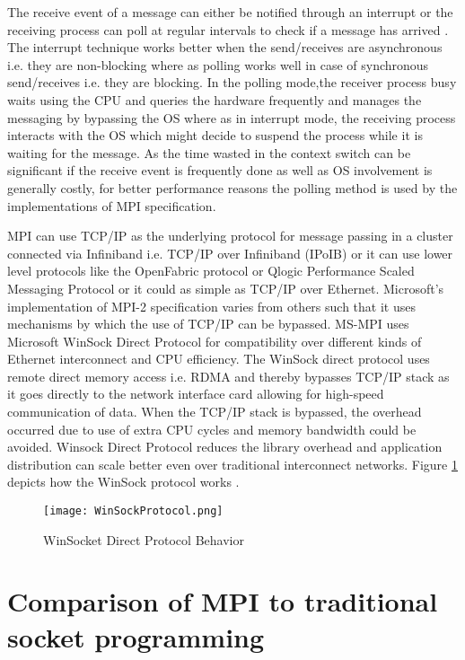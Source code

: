 The receive event of a message can either be notified through an interrupt or the receiving process can poll at regular intervals to check if a message has arrived \cite{mpirel}. The interrupt technique works better when the send/receives are asynchronous i.e. they are non-blocking where as polling works well in case of synchronous send/receives i.e. they are blocking. In the polling mode,the receiver process busy waits using the CPU and queries the hardware frequently and manages the messaging by bypassing the OS where as in interrupt mode, the receiving process interacts with the OS which might decide to suspend the process while it is waiting for the message. As the time wasted in the context switch can be significant if the receive event is frequently done as well as OS involvement is generally costly, for better performance reasons the polling method is used by the implementations of MPI specification. \newline

MPI can use TCP/IP as the underlying protocol for message passing in a cluster connected via Infiniband i.e. TCP/IP over Infiniband (IPoIB) or it can use lower level protocols like the OpenFabric protocol or Qlogic Performance Scaled Messaging Protocol or it could as simple as TCP/IP over Ethernet. Microsoft's implementation of MPI-2 specification varies from others such that it uses mechanisms by which the use of TCP/IP can be bypassed. MS-MPI uses Microsoft WinSock Direct Protocol for compatibility over different kinds of Ethernet interconnect and CPU efficiency. The WinSock direct protocol \cite{SDP} uses remote direct memory access i.e. RDMA and thereby bypasses TCP/IP stack as it goes directly to the network interface card allowing for high-speed communication of data. When the TCP/IP stack is bypassed, the overhead occurred due to use of extra CPU cycles and memory bandwidth could be avoided. Winsock Direct Protocol reduces the library overhead and application distribution can scale better even over traditional interconnect networks. Figure \ref{fig:WinsockProto} depicts how the WinSock protocol works \cite{msmpiWinSoc}. \newline

\begin{figure}[ht!]
\centering
\texttt{[image: WinSockProtocol.png]}
\caption{WinSocket Direct Protocol Behavior}
\label{fig:WinsockProto}
\end{figure}
   
\section{Comparison of MPI to traditional socket programming}


